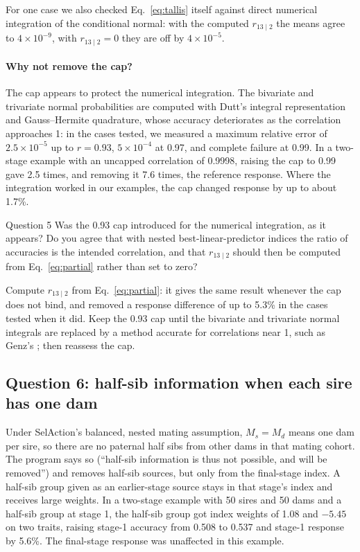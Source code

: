 \documentclass[11pt]{article}
\begin{document}
For one case we also checked Eq.~\eqref{eq:tallis} itself against direct numerical integration of the conditional normal: with the computed $r_{13\mid2}$ the means agree to $4\times10^{-9}$, with $r_{13\mid2}=0$ they are off by $4\times10^{-5}$.

\paragraph{Why not remove the cap?} The cap appears to protect the numerical integration. The bivariate and trivariate normal probabilities are computed with Dutt's integral representation \cite{dutt1973} and Gauss--Hermite quadrature, whose accuracy deteriorates as the correlation approaches 1: in the cases tested, we measured a maximum relative error of $2.5\times10^{-5}$ up to $r=0.93$, $5\times10^{-4}$ at 0.97, and complete failure at 0.99. In a two-stage example with an uncapped correlation of 0.9998, raising the cap to 0.99 gave 2.5 times, and removing it 7.6 times, the reference response. Where the integration worked in our examples, the cap changed response by up to about 1.7\%.

\begin{question}{Question 5}
Was the 0.93 cap introduced for the numerical integration, as it appears? Do you agree that with nested best-linear-predictor indices the ratio of accuracies is the intended correlation, and that $r_{13\mid2}$ should then be computed from Eq.~\eqref{eq:partial} rather than set to zero?
\end{question}
\begin{recommend}
Compute $r_{13\mid2}$ from Eq.~\eqref{eq:partial}: it gives the same result whenever the cap does not bind, and removed a response difference of up to 5.3\% in the cases tested when it did. Keep the 0.93 cap until the bivariate and trivariate normal integrals are replaced by a method accurate for correlations near 1, such as Genz's \cite{genz2004}; then reassess the cap.
\end{recommend}

\subsection{Question 6: half-sib information when each sire has one dam}
Under SelAction's balanced, nested mating assumption, $M_s=M_d$ means one dam per sire, so there are no paternal half sibs from other dams in that mating cohort. The program says so (``half-sib information is thus not possible, and will be removed'') and removes half-sib sources, but only from the final-stage index. A half-sib group given as an earlier-stage source stays in that stage's index and receives large weights. In a two-stage example with 50 sires and 50 dams and a half-sib group at stage 1, the half-sib group got index weights of 1.08 and $-5.45$ on two traits, raising stage-1 accuracy from 0.508 to 0.537 and stage-1 response by 5.6\%. The final-stage response was unaffected in this example.
\end{document}
